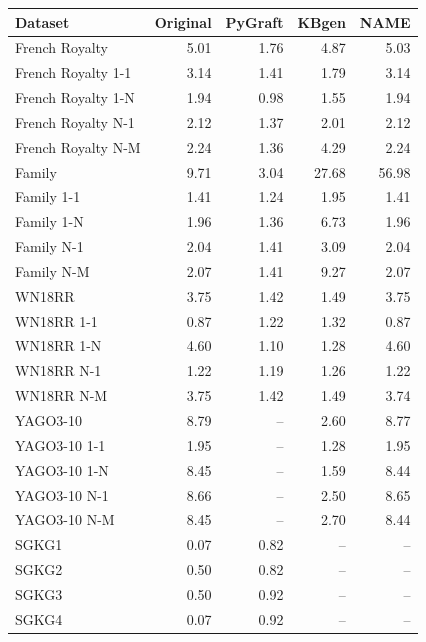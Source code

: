 \begin{tabular}{lrrrr}
\toprule
Dataset & Original & PyGraft & KBgen & NAME \\
\midrule
French Royalty & 5.01 & 1.76 & 4.87 & 5.03 \\
French Royalty 1-1 & 3.14 & 1.41 & 1.79 & 3.14 \\
French Royalty 1-N & 1.94 & 0.98 & 1.55 & 1.94 \\
French Royalty N-1 & 2.12 & 1.37 & 2.01 & 2.12 \\
French Royalty N-M & 2.24 & 1.36 & 4.29 & 2.24 \\
\midrule
Family & 9.71 & 3.04 & 27.68 & 56.98 \\
Family 1-1 & 1.41 & 1.24 & 1.95 & 1.41 \\
Family 1-N & 1.96 & 1.36 & 6.73 & 1.96 \\
Family N-1 & 2.04 & 1.41 & 3.09 & 2.04 \\
Family N-M & 2.07 & 1.41 & 9.27 & 2.07 \\
\midrule
WN18RR & 3.75 & 1.42 & 1.49 & 3.75 \\
WN18RR 1-1 & 0.87 & 1.22 & 1.32 & 0.87 \\
WN18RR 1-N & 4.60 & 1.10 & 1.28 & 4.60 \\
WN18RR N-1 & 1.22 & 1.19 & 1.26 & 1.22 \\
WN18RR N-M & 3.75 & 1.42 & 1.49 & 3.74 \\
\midrule
YAGO3-10 & 8.79 & – & 2.60 & 8.77 \\
YAGO3-10 1-1 & 1.95 & – & 1.28 & 1.95 \\
YAGO3-10 1-N & 8.45 & – & 1.59 & 8.44 \\
YAGO3-10 N-1 & 8.66 & – & 2.50 & 8.65 \\
YAGO3-10 N-M & 8.45 & – & 2.70 & 8.44 \\
\midrule
SGKG1 & 0.07 & 0.82 & – & – \\
SGKG2 & 0.50 & 0.82 & – & – \\
SGKG3 & 0.50 & 0.92 & – & – \\
SGKG4 & 0.07 & 0.92 & – & – \\
\bottomrule
\end{tabular}
